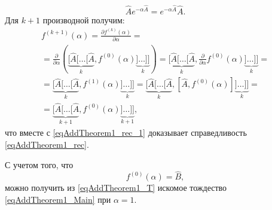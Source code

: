 \begin{equation}
\hat{A}e^{-\alpha\hat{A}} = e^{-\alpha\hat{A}} \hat{A}.
\nonumber
\end{equation}
Для $k+1$ производной получим:
\begin{eqnarray}
f^{(k + 1)}\left(\alpha\right) = 
\frac{\partial f^{(k)}\left(\alpha\right)}{\partial \alpha} =
\nonumber \\
=\frac{\partial }{\partial \alpha}
\left(
\underbrace{
[\hat{A}[\dots[\hat{A}}_{k},
f^{(0)}\left(\alpha\right)
\underbrace{]\dots]]}_{k} \right) =  
\underbrace{
[\hat{A}[\dots[\hat{A}}_{k},
\frac{\partial }{\partial \alpha}f^{(0)}\left(\alpha\right)
\underbrace{]\dots]]}_{k} =
\nonumber \\
= 
\underbrace{
[\hat{A}[\dots[\hat{A}}_{k},
f^{(1)}\left(\alpha\right)
\underbrace{]\dots]]}_{k} =
\underbrace{
[\hat{A}[\dots[\hat{A}}_{k},
\left[\hat{A}, f^{(0)}\left(\alpha\right)\right]
\underbrace{]\dots]]}_{k} =
\nonumber \\
=
\underbrace{
[\hat{A}[\dots[\hat{A}}_{k + 1},
f^{(0)}\left(\alpha\right)
\underbrace{]\dots]]}_{k + 1},
\nonumber
\end{eqnarray}
что вместе с \eqref{eqAddTheorem1_rec_1} доказывает справедливость 
\eqref{eqAddTheorem1_rec}.

С учетом того, что 
\begin{equation}
f^{(0)}\left(\alpha\right) = \hat{B},
\nonumber
\end{equation}
можно получить из \eqref{eqAddTheorem1_T} искомое тождество
\eqref{eqAddTheorem1_Main} при $\alpha = 1$. 


